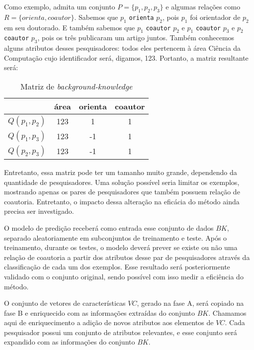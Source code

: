 Como exemplo, admita um conjunto $P = \{ p_1, p_2, p_3 \}$ e algumas relações
como $R = \{ orienta, coautor \}$. Sabemos que $p_1$ \texttt{orienta} $p_2$, pois $p_1$ foi orientador de $p_2$ em seu doutorado. E também sabemos que $p_1$ \texttt{coautor} $p_2$ e $p_1$ \texttt{coautor} $p_3$ e $p_2$ \texttt{coautor} $p_3$, pois os três publicaram um artigo juntos. Também conhecemos alguns atributos desses pesquisadores: todos eles pertencem à área Ciência da Computação cujo identificador será, digamos, 123. Portanto, a matriz resultante será:

\begin{table}[h!]
    \centering
    \begin{tabular}{|c|c|c|c|}
     \hline
      & área & orienta & coautor   \\
     \hline\hline
     $Q(p_1, p_2)$ & 123 & 1  & 1  \\
     \hline
     $Q(p_1, p_3)$ & 123 & -1 & 1  \\
     \hline
     $Q(p_2, p_3)$ & 123 & -1 & 1  \\
     \hline
    \end{tabular}
    \caption{Matriz de \textit{background-knowledge} }
    \label{matriz-relacoes}
\end{table}

Entretanto, essa matriz pode ter um tamanho muito grande, dependendo da quantidade de pesquisadores. Uma solução possível seria limitar os exemplos, mostrando apenas os pares de pesquisadores que também possuem relação de coautoria. Entretanto, o impacto dessa alteração na eficácia do método ainda precisa ser investigado.

O modelo de predição receberá como entrada esse conjunto de dados $BK$, separado aleatoriamente em subconjuntos de treinamento e teste. Após o treinamento, durante os testes, o modelo deverá prever se existe ou não uma relação de coautoria a partir dos atributos desse par de pesquisadores através da classificação de cada um dos exemplos. Esse resultado será posteriormente validado com o conjunto original, sendo possível com isso medir a eficiência do método.

O conjunto de vetores de características $VC$, gerado na fase A, será copiado na fase B e enriquecido com as informações extraídas do conjunto $BK$. Chamamos aqui de enriquecimento a adição de novos atributos aos elementos de $VC$. Cada pesquisador possui um conjunto de atributos relevantes, e esse conjunto será expandido com as informações do conjunto $BK$.

